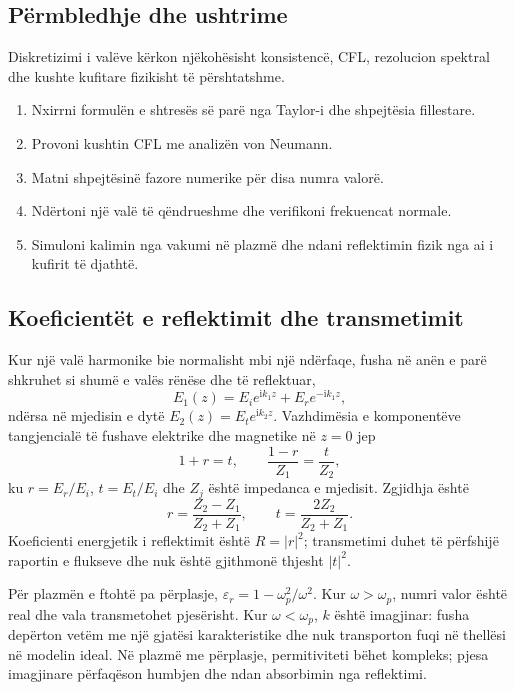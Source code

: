 \documentclass[11pt,oneside,openany]{book}
\begin{document}
\subsection{Përmbledhje dhe ushtrime}
Diskretizimi i valëve kërkon njëkohësisht konsistencë, CFL, rezolucion spektral dhe kushte kufitare fizikisht të përshtatshme.
\begin{enumerate}
\item Nxirrni formulën e shtresës së parë nga Taylor-i dhe shpejtësia fillestare.
\item Provoni kushtin CFL me analizën von Neumann.
\item Matni shpejtësinë fazore numerike për disa numra valorë.
\item Ndërtoni një valë të qëndrueshme dhe verifikoni frekuencat normale.
\item Simuloni kalimin nga vakumi në plazmë dhe ndani reflektimin fizik nga ai i kufirit të djathtë.
\end{enumerate}



\subsection{Koeficientët e reflektimit dhe transmetimit}
Kur një valë harmonike bie normalisht mbi një ndërfaqe, fusha në anën e parë shkruhet si shumë e valës rënëse dhe të reflektuar,
\begin{equation}
 E_1(z)=E_i e^{\mathrm{i}k_1z}+E_r e^{-\mathrm{i}k_1z},
\end{equation}
ndërsa në mjedisin e dytë $E_2(z)=E_t e^{\mathrm{i}k_2z}$. Vazhdimësia e komponentëve tangjencialë të fushave elektrike dhe magnetike në $z=0$ jep
\begin{equation}
 1+r=t,
 \qquad
 \frac{1-r}{Z_1}=\frac{t}{Z_2},
\end{equation}
ku $r=E_r/E_i$, $t=E_t/E_i$ dhe $Z_j$ është impedanca e mjedisit. Zgjidhja është
\begin{equation}
 r=\frac{Z_2-Z_1}{Z_2+Z_1},
 \qquad
 t=\frac{2Z_2}{Z_2+Z_1}.
\end{equation}
Koeficienti energjetik i reflektimit është $R=|r|^2$; transmetimi duhet të përfshijë raportin e flukseve dhe nuk është gjithmonë thjesht $|t|^2$.

Për plazmën e ftohtë pa përplasje, $\varepsilon_r=1-\omega_p^2/\omega^2$. Kur $\omega>\omega_p$, numri valor është real dhe vala transmetohet pjesërisht. Kur $\omega<\omega_p$, $k$ është imagjinar: fusha depërton vetëm me një gjatësi karakteristike dhe nuk transporton fuqi në thellësi në modelin ideal. Në plazmë me përplasje, permitiviteti bëhet kompleks; pjesa imagjinare përfaqëson humbjen dhe ndan absorbimin nga reflektimi.
\end{document}
